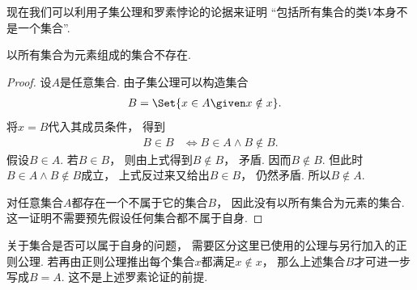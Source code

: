 现在我们可以利用子集公理和罗素悖论的论据来证明%
“包括所有集合的类\(V\)本身不是一个集合”.
\begin{theorem}\label{theorem:集合论.以所有集合为元素组成的集合不存在}
    以所有集合为元素组成的集合不存在.
    \begin{proof}
        设\(A\)是任意集合.
        由子集公理可以构造集合
        \begin{align*}
            B &= \Set{x\in A\given x\notin x}.
        \end{align*}
        将\(x=B\)代入其成员条件，
        得到
        \begin{align*}
            B\in B &\iff B\in A\land B\notin B.
        \end{align*}
        假设\(B\in A\).
        若\(B\in B\)，
        则由上式得到\(B\notin B\)，
        矛盾.
        因而\(B\notin B\).
        但此时\(B\in A\land B\notin B\)成立，
        上式反过来又给出\(B\in B\)，
        仍然矛盾.
        所以\(B\notin A\).

        对任意集合\(A\)都存在一个不属于它的集合\(B\)，
        因此没有以所有集合为元素的集合.
        这一证明不需要预先假设任何集合都不属于自身.
    \end{proof}
\end{theorem}
关于集合是否可以属于自身的问题，
需要区分这里已使用的公理与另行加入的正则公理.
若再由正则公理推出每个集合\(x\)都满足\(x\notin x\)，
那么上述集合\(B\)才可进一步写成\(B=A\).
这不是上述罗素论证的前提.

